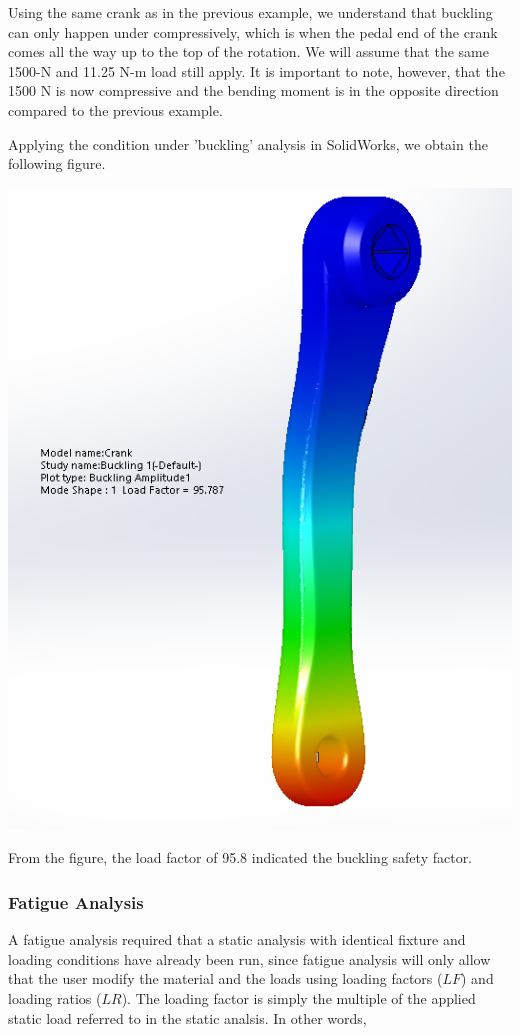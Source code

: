 \documentclass[a4paper,openany,nobib]{tufte-book}
\begin{document}
{{Using the same crank as in the previous example, we understand that
buckling can only happen under compressively, which is when the pedal
end of the crank comes all the way up to the top of the rotation. We
will assume that the same 1500-N and 11.25 N-m load still apply. It is
important to note, however, that the 1500 N is now compressive and the
bending moment is in the opposite direction compared to the previous
example.

Applying the condition under 'buckling' analysis in SolidWorks, we
obtain the following figure.


\begin{center}
\includegraphics[width=.9\linewidth]{pictures/Intro-CAD/Crank-buckling.png}
\end{center}

From the figure, the load factor of 95.8 indicated the buckling safety
factor.

\subsubsection{Fatigue Analysis}
\label{fatigue-analysis}
A fatigue analysis required that a static analysis with identical
fixture and loading conditions have already been run, since fatigue
analysis will only allow that the user modify the material and the loads
using loading factors (\(LF\)) and loading ratios (\(LR\)). The loading
factor is simply the multiple of the applied static load referred to in
the static analsis. In other words,

}}
\end{document}
